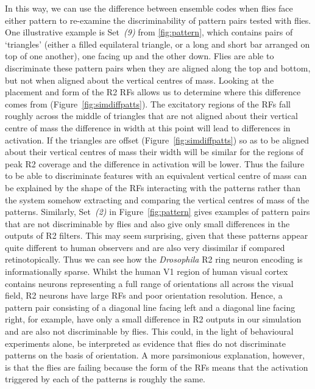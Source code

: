 \documentclass[10pt]{article}
\begin{document}
In this way, we can use the difference between ensemble codes when flies face either pattern to re-examine the discriminability of pattern pairs tested with flies. One illustrative example is Set~\emph{(9)} from \ref{fig:pattern}, which contains pairs of ‘triangles’ (either a filled equilateral triangle, or a long and short bar arranged on top of one another), one facing up and the other down. Flies are able to discriminate these pattern pairs when they are aligned along the top and bottom, but not when aligned about the vertical centres of mass\cite{Ernst1999}. Looking at the placement and form of the R2 RFs allows us to determine where this difference comes from (Figure~\ref{fig:simdiffpatts}). The excitatory regions of the RFs fall roughly across the middle of triangles that are not aligned about their vertical centre of mass the difference in width at this point will lead to differences in activation. If the triangles are offset (Figure~\ref{fig:simdiffpatts}) so as to be aligned about their vertical centres of mass their width will be similar for the regions of peak R2 coverage and the difference in activation will be lower. Thus the failure to be able to discriminate features with an equivalent vertical centre of mass can be explained by the shape of the RFs interacting with the patterns rather than the system somehow extracting and comparing the vertical centres of mass of the patterns.  
Similarly, Set~\emph{(2)} in Figure~\ref{fig:pattern} gives examples of pattern pairs that are not discriminable by flies and also give only small differences in the outputs of R2 filters. This may seem surprising, given that these patterns appear quite different to human observers and are also very dissimilar if compared retinotopically. Thus we can see how the \emph{Drosophila} R2 ring neuron encoding is informationally sparse. Whilst the human V1 region of human visual cortex contains neurons representing a full range of orientations all across the visual field, R2 neurons have large RFs and poor orientation resolution. Hence, a pattern pair consisting of a diagonal line facing left and a diagonal line facing right, for example, have only a small difference in R2 outputs in our simulation and are also not discriminable by flies. This could, in the light of behavioural experiments alone, be interpreted as evidence that flies do not discriminate patterns on the basis of orientation. A more parsimonious explanation, however, is that the flies are failing because the form of the RFs means that the activation triggered by each of the patterns is roughly the same. 
\end{document}
